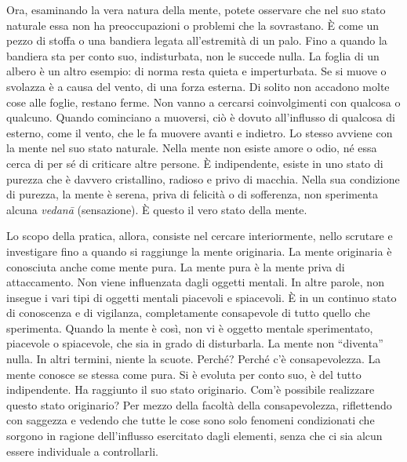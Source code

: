 Ora, esaminando la vera natura della mente, potete osservare che nel suo
stato naturale essa non ha preoccupazioni o problemi che la sovrastano.
È come un pezzo di stoffa o una bandiera legata all'estremità di un
palo. Fino a quando la bandiera sta per conto suo, indisturbata, non le
succede nulla. La foglia di un albero è un altro esempio: di norma resta
quieta e imperturbata. Se si muove o svolazza è a causa del vento, di
una forza esterna. Di solito non accadono molte cose alle foglie,
restano ferme. Non vanno a cercarsi coinvolgimenti con qualcosa o
qualcuno. Quando cominciano a muoversi, ciò è dovuto all'influsso di
qualcosa di esterno, come il vento, che le fa muovere avanti e indietro.
Lo stesso avviene con la mente nel suo stato naturale. Nella mente non
esiste amore o odio, né essa cerca di per sé di criticare altre persone.
È indipendente, esiste in uno stato di purezza che è davvero
cristallino, radioso e privo di macchia. Nella sua condizione di
purezza, la mente è serena, priva di felicità o di sofferenza, non
sperimenta alcuna \emph{vedanā} (sensazione). È questo il vero stato
della mente.

Lo scopo della pratica, allora, consiste nel cercare interiormente,
nello scrutare e investigare fino a quando si raggiunge la mente
originaria. La mente originaria è conosciuta anche come mente pura. La
mente pura è la mente priva di attaccamento. Non viene influenzata dagli
oggetti mentali. In altre parole, non insegue i vari tipi di oggetti
mentali piacevoli e spiacevoli. È in un continuo stato di conoscenza e
di vigilanza, completamente consapevole di tutto quello che sperimenta.
Quando la mente è così, non vi è oggetto mentale sperimentato, piacevole
o spiacevole, che sia in grado di disturbarla. La mente non ``diventa''
nulla. In altri termini, niente la scuote. Perché? Perché c'è
consapevolezza. La mente conosce se stessa come pura. Si è evoluta per
conto suo, è del tutto indipendente. Ha raggiunto il suo stato
originario. Com'è possibile realizzare questo stato originario? Per
mezzo della facoltà della consapevolezza, riflettendo con saggezza e
vedendo che tutte le cose sono solo fenomeni condizionati che sorgono in
ragione dell'influsso esercitato dagli elementi, senza che ci sia alcun
essere individuale a controllarli.

